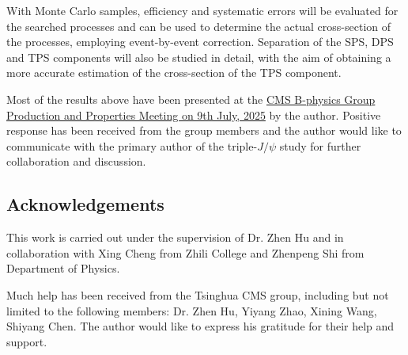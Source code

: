\documentclass[10pt,twocolumn]{article}
\begin{document}
With Monte Carlo samples, efficiency and systematic errors will be evaluated for the searched processes and can be used to determine the actual cross-section of the processes, employing event-by-event correction. Separation of the SPS, DPS and TPS components will also be studied in detail, with the aim of obtaining a more accurate estimation of the cross-section of the TPS component.

Most of the results above have been presented at the \href{}{CMS B-physics Group Production and Properties Meeting on 9th July, 2025} by the author. Positive response has been received from the group members and the author would like to communicate with the primary author of the triple-$J/\psi$ study for further collaboration and discussion.

\subsection{Acknowledgements}

This work is carried out under the supervision of Dr. Zhen Hu and in collaboration with Xing Cheng from Zhili College and Zhenpeng Shi from Department of Physics.

Much help has been received from the Tsinghua CMS group, including but not limited to the following members: Dr. Zhen Hu, Yiyang Zhao, Xining Wang, Shiyang Chen. The author would like to express his gratitude for their help and support.



\end{document}

